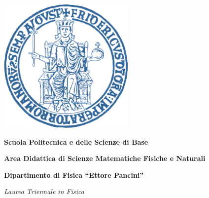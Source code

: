 \begin{titlepage}
    \begin{addmargin}[-1cm]{-3cm}

    \begin{center}
        {\Large {\textbf \myUni}}
    \end{center} 

    \begin{center}
    \includegraphics[width=0.5\textwidth]{gfx/logo-federico-II-blu}
    \end{center}

        \begin{center}
            \textbf{Scuola Politecnica e delle Scienze di Base}
        \end{center}
        \begin{center}
            \textbf{Area Didattica di Scienze Matematiche Fisiche e Naturali}
        \end{center}
        \vspace{5pt}
        \begin{center}
            \textbf{Dipartimento di Fisica \textquotedblleft Ettore Pancini\textquotedblright}
        \end{center}
        \vspace{15pt}
        \begin{center}
            {{ \textit{Laurea Triennale in Fisica}}}
        \end{center}
        \vspace{40pt}

        \begin{center}
            \begingroup
            {\Large\spacedallcaps{\textbf{\myTitle}}}
            \endgroup
        \end{center}
        

\end{addmargin}
\end{titlepage}
